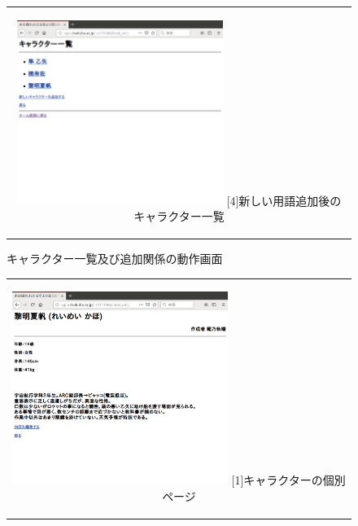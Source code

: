 \documentclass[12pt,a4paper]{jarticle}
\begin{document}
\begin{ttfamily}
\begin{figure}[htbp]
\begin{center}
\begin{tabular}{c}
      \begin{minipage}{0.55\hsize}
        \begin{center}
          \includegraphics[width=6.7cm]{10-3-24.eps}
          \hspace{1.6cm} [4]新しい用語追加後のキャラクター一覧
        \end{center}
      \end{minipage}

    \end{tabular}
    \caption{キャラクター一覧及び追加関係の動作画面}
    \label{fig:b}
  \end{center}
\end{figure}

\begin{figure}[htbp]
  \begin{center}
    \begin{tabular}{c}

      \begin{minipage}{0.55\hsize}
        \begin{center}
          \includegraphics[width=7.0cm]{10-3-25.eps}
          \hspace{1.6cm} [1]キャラクターの個別ページ
        \end{center}
      \end{minipage}


\end{tabular}
\end{center}
\end{figure}
\end{ttfamily}
\end{document}
